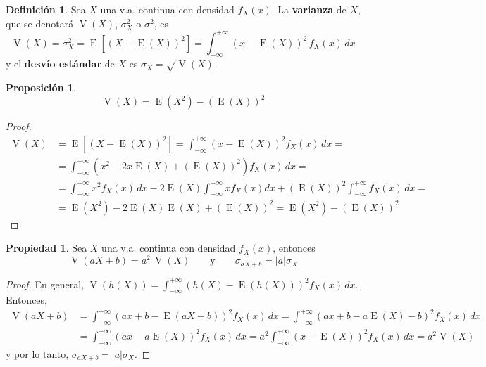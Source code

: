 \documentclass[11pt]{article}
\theoremstyle{plain}
\newtheorem*{pro}{Proposición}
\theoremstyle{definition}
\newtheorem*{defi}{Definición}
\newtheorem*{prop}{Propiedad}
\theoremstyle{remark}
\newcommand{\deft}[1]{\textbf{#1}}  %
\newcommand{\esp}[0]{\ensuremath{\operatorname{E}}}  %
\newcommand{\var}[0]{\ensuremath{\operatorname{V}}}  %
\begin{document}
      \begin{defi}
        Sea $X$ una v.a. continua con densidad $f_X(x)$. La \deft{varianza} de $X$, que se denotará $\var(X)$, $\sigma_X^2$ o $\sigma^2$, es
        \[ \var(X) = \sigma_X^2 = \esp\left[ (X - \esp(X))^2 \right] = \int_{-\infty}^{+\infty} (x - \esp(X))^2 \, f_X(x) \,dx \]
        y el \deft{desvío estándar} de $X$ es $\sigma_X = \sqrt{\var(X)}$.
      \end{defi}

      \begin{pro}
        \[ \var(X) = \esp(X^2) - (\esp(X))^2 \]
      \end{pro}
      \begin{proof}
        \[ \begin{split}
          \var(X) &= \esp \left[ (X - \esp(X))^2 \right] = \int_{-\infty}^{+\infty} (x - \esp(X))^2 f_X(x) \,dx = \\
          &= \int_{-\infty}^{+\infty} (x^2 - 2x \esp(X) + (\esp(X))^2) f_X(x) \,dx = \\
          &= \int_{-\infty}^{+\infty} x^2 f_X(x) \,dx - 2 \esp(X) \int_{-\infty}^{+\infty} x f_X(x) dx + (\esp(X))^2 \int_{-\infty}^{+\infty} f_X(x) \,dx = \\
          &= \esp(X^2) - 2 \esp(X) \esp(X) + (\esp(X))^2 = \esp(X^2) - (\esp(X))^2
        \end{split} \]
      \end{proof}

      \begin{prop}
        Sea $X$ una v.a. continua con densidad $f_X(x)$, entonces
        \[ \var(aX + b) = a^2 \, \var(X) \qquad \text{y} \qquad \sigma_{aX + b} = |a| \sigma_X \]
      \end{prop}
      \begin{proof}
        En general, $\var(h(X)) = \int_{-\infty}^{+\infty} (h(X) - \esp(h(X)))^2 f_X(x) \,dx$.
        Entonces,
        \[ \begin{split}
        \var(aX + b) &= \int_{-\infty}^{+\infty} (ax + b - \esp(aX + b))^2 f_X(x) \,dx = \int_{-\infty}^{+\infty} (ax + b - a \esp(X) - b)^2 f_X(x) \,dx \\
        &= \int_{-\infty}^{+\infty} (ax - a \esp(X))^2 f_X(x) \,dx = a^2 \int_{-\infty}^{+\infty} (x - \esp(X))^2 f_X(x) \,dx = a^2 \var(X)
        \end{split} \]
        y por lo tanto, $\sigma_{aX + b} = \vert a \vert \sigma_X$.
      \end{proof}
\end{document}
